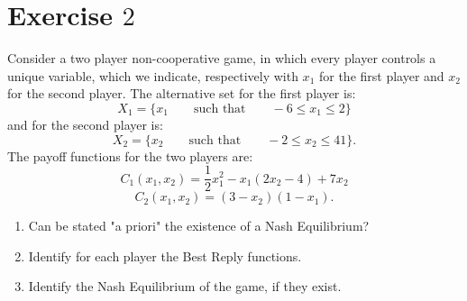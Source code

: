 \documentclass[a4paper, twoside, openany]{book}
\begin{document}
\section*{Exercise $2$}
Consider a two player non-cooperative game, in which every player controls a unique variable, which we indicate, respectively with $x_1$ for the first player and $x_2$ for the second player. The alternative set for the first player is:
$$X_1 = \{ x_1 \qquad \textrm{such that} \qquad -6 \leq x_1 \leq 2 \}$$
and for the second player is:
$$X_2 = \{ x_2 \qquad \textrm{such that} \qquad -2 \leq x_2 \leq 4 1 \}.$$
The payoff functions for the two players are:
$$C_1(x_1, x_2) = \frac{1}{2}x_1^2 - x_1(2x_2 - 4) + 7 x_2$$
$$C_2(x_1, x_2) = (3 - x_2)(1 - x_1).$$
\begin{enumerate}[label=\alph*.]
\item Can be stated "a priori" the existence of a Nash Equilibrium?
\item Identify for each player the Best Reply functions.
\item Identify the Nash Equilibrium of the game, if they exist. 
\end{enumerate}
\end{document}

